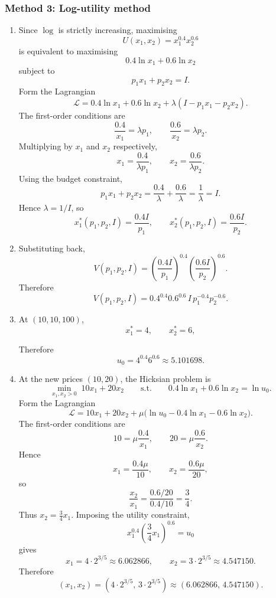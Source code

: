 \documentclass[12pt]{article}
\begin{document}
\subsubsection{Method 3: Log-utility method}
\begin{enumerate}[label=(\alph*)]
    \item
    Since \(\log\) is strictly increasing, maximising
    \[
    U(x_1,x_2)=x_1^{0.4}x_2^{0.6}
    \]
    is equivalent to maximising
    \[
    0.4\ln x_1+0.6\ln x_2
    \]
    subject to
    \[
    p_1x_1+p_2x_2=I.
    \]
    Form the Lagrangian
    \[
    \mathcal L=0.4\ln x_1+0.6\ln x_2+\lambda(I-p_1x_1-p_2x_2).
    \]
    The first-order conditions are
    \[
    \frac{0.4}{x_1}=\lambda p_1,
    \qquad
    \frac{0.6}{x_2}=\lambda p_2.
    \]
    Multiplying by \(x_1\) and \(x_2\) respectively,
    \[
    x_1=\frac{0.4}{\lambda p_1},
    \qquad
    x_2=\frac{0.6}{\lambda p_2}.
    \]
    Using the budget constraint,
    \[
    p_1x_1+p_2x_2
    =
    \frac{0.4}{\lambda}+\frac{0.6}{\lambda}
    =
    \frac{1}{\lambda}
    =
    I.
    \]
    Hence \(\lambda=1/I\), so
    \[
    \boxed{
    x_1^*(p_1,p_2,I)=\frac{0.4I}{p_1},
    \qquad
    x_2^*(p_1,p_2,I)=\frac{0.6I}{p_2}.
    }
    \]

    \item
    Substituting back,
    \[
    V(p_1,p_2,I)
    =
    \left(\frac{0.4I}{p_1}\right)^{0.4}
    \left(\frac{0.6I}{p_2}\right)^{0.6}.
    \]
    Therefore
    \[
    \boxed{
    V(p_1,p_2,I)=0.4^{0.4}0.6^{0.6}\,I\,p_1^{-0.4}p_2^{-0.6}.
    }
    \]

    \item
    At \((10,10,100)\),
    \[
    x_1^*=4,\qquad x_2^*=6,
    \]

    Therefore
    \[
    \boxed{u_0=4^{0.4}6^{0.6}\approx 5.101698.}
    \]

    \item
    At the new prices \((10,20)\), the Hicksian problem is
    \[
    \min_{x_1,x_2>0}\;10x_1+20x_2
    \qquad\text{s.t.}\qquad
    0.4\ln x_1+0.6\ln x_2=\ln u_0.
    \]
    Form the Lagrangian
    \[
    \mathcal L=10x_1+20x_2+\mu\bigl(\ln u_0-0.4\ln x_1-0.6\ln x_2\bigr).
    \]
    The first-order conditions are
    \[
    10=\mu\frac{0.4}{x_1},
    \qquad
    20=\mu\frac{0.6}{x_2}.
    \]
    Hence
    \[
    x_1=\frac{0.4\mu}{10},
    \qquad
    x_2=\frac{0.6\mu}{20},
    \]
    so
    \[
    \frac{x_2}{x_1}=\frac{0.6/20}{0.4/10}=\frac34.
    \]
    Thus \(x_2=\frac34x_1\). Imposing the utility constraint,
    \[
    x_1^{0.4}\left(\frac34x_1\right)^{0.6}=u_0
    \]
    gives
    \[
    x_1=4\cdot 2^{3/5}\approx 6.062866,
    \qquad
    x_2=3\cdot 2^{3/5}\approx 4.547150.
    \]
    Therefore
    \[
    \boxed{\left(x_1,x_2\right)=\left(4\cdot 2^{3/5},\,3\cdot 2^{3/5}\right)\approx(6.062866,\,4.547150).}
    \]
\end{enumerate}
\end{document}
